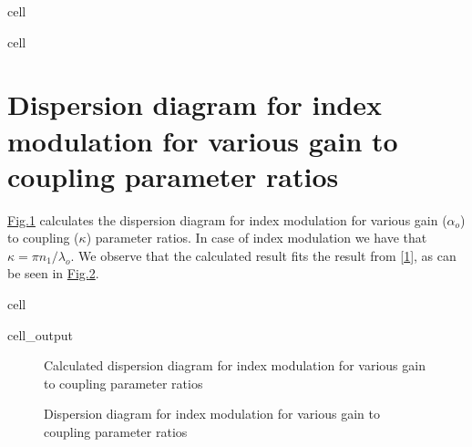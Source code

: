 \documentclass[a4paper,10pt,english,openany,oneside]{jupyterBook}
\begin{document}
\begin{sphinxuseclass}{cell}
\end{sphinxuseclass}
\begin{sphinxuseclass}{cell}
\end{sphinxuseclass}

\section{Dispersion diagram for index modulation for various gain to coupling parameter ratios}
\label{\detokenize{Kogelnik-Shank_Coupled-Wave-Theory_DFB-Lasers:dispersion-diagram-for-index-modulation-for-various-gain-to-coupling-parameter-ratios}}
\sphinxAtStartPar
\hyperref[\detokenize{Kogelnik-Shank_Coupled-Wave-Theory_DFB-Lasers:kogelnik1}]{Fig.\@ \ref{\detokenize{Kogelnik-Shank_Coupled-Wave-Theory_DFB-Lasers:kogelnik1}}} calculates the dispersion diagram for index modulation for various gain (\(\alpha_o\)) to coupling (\(\kappa\)) parameter ratios. In case of index modulation we have that \(\kappa= \pi n_1/\lambda_o\). We observe that the calculated result fits the result from {[}\hyperlink{cite.bib:id3}{1}{]}, as can be seen in \hyperref[\detokenize{Kogelnik-Shank_Coupled-Wave-Theory_DFB-Lasers:kogelnik2}]{Fig.\@ \ref{\detokenize{Kogelnik-Shank_Coupled-Wave-Theory_DFB-Lasers:kogelnik2}}}.

\begin{sphinxuseclass}{cell}\begin{sphinxVerbatimOutput}

\begin{sphinxuseclass}{cell_output}
\begin{figure}[htbp]
\centering
\capstart

\noindent{}
\caption{Calculated dispersion diagram for index modulation for various gain to coupling parameter ratios}\label{\detokenize{Kogelnik-Shank_Coupled-Wave-Theory_DFB-Lasers:kogelnik1}}\end{figure}

\end{sphinxuseclass}\end{sphinxVerbatimOutput}

\end{sphinxuseclass}
\begin{figure}[htbp]
\centering
\capstart

\noindent{}
\caption{Dispersion diagram for index modulation for various gain to coupling parameter ratios}\label{\detokenize{Kogelnik-Shank_Coupled-Wave-Theory_DFB-Lasers:kogelnik2}}\end{figure}
\end{document}

